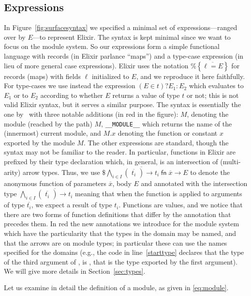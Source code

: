 \documentclass[a4paper,10pt]{article}
\DeclareMathOperator{\kwfn}{\textsf{fn}}
\newcommand{\self}{\texttt{\_\_MODULE\_\_}}
\begin{document}
\subsection{Expressions}
In Figure~\ref{fig:surfacesyntax} we specified a minimal set of expressions---ranged over by $E$---to represent Elixir. The syntax is kept minimal since we want to focus on the module system. So our expressions form a simple functional language with records (in Elixir parlance ``maps'') and a type-case expression (in lieu of more general case expressions).  Elixir uses the notation $\texttt{\%}\!\left\{\overline{\ell=E}\right\}$ for records (maps) with fields $\ell$ initialized to $E$, and we reproduce it here faithfully. For type-cases we use instead the expression $(E\in t)?E_1:E_2$ which evaluates to $E_1$ or to $E_2$ according to whether $E$ returns a value of type $t$ or not; this is not valid Elixir syntax, but it serves a similar purpose. The syntax is essentially the one by~\cite{CDV24} with three notable additions (in red in the figure): $M$, denoting the module (reached by the path) $M$, \self{} which returns the name of the (innermost) current module, and $M.x$ denoting the function or constant $x$ exported by the module $M$. The other expressions are standard, though the syntax may not be familiar to the reader. In particular, functions in Elixir are prefixed by their type declaration which, in general, is an intersection of (multi-arity) arrow types. Thus, we use $\$\bigwedge_{i\in I} \overline{(\,\overline{\,t_i\,}\,)\rightarrow t_i} \kwfn \overline{x} \rightarrow E$ to denote the anonymous function of parameters $\overline{x}$, body $E$ and annotated with the intersection type $\bigwedge_{i\in I} \overline{(\,\overline{\,t_i\,}\,)\rightarrow t_i}$ meaning that when the function is applied to arguments of type $\overline{t_i}$, we expect a result of type $t_i$. Functions are values, and we notice that there are two forms of function definitions that differ by the annotation that precedes them. In red the new annotations we introduce for the module system which have the particularity that the types in the domain may be named, and that the arrows are on module types; in particular these can use the names specified for the domains (e.g., the code in line~\ref{starttype} declares that the type of the third argument of , is , that is the  type exported by the first argument). We will give more details in Section~\ref{sec:types}.

Let us examine in detail the definition of a module, as given in \eqref{eq:module}.
\end{document}

